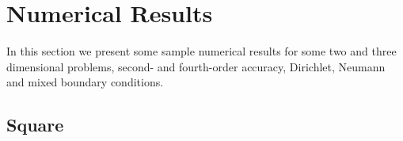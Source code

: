 \documentclass{article}
\begin{document}




\clearpage
\section{Numerical Results}\label{sec:numericalResults}

In this section we present some sample numerical results for some
two and three dimensional problems, second- and fourth-order accuracy, Dirichlet, Neumann and
mixed boundary conditions.



\subsection{Square}
\end{document}
